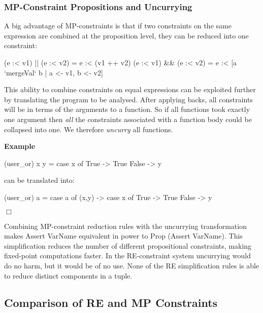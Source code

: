 \documentclass[preprint]{sigplanconf}
\newcommand{\C}[1]{\textsf{#1}}
\newcounter{exmp}
\newcommand{\yesexample}{\addtocounter{exmp}{1}\addvspace{2mm}\noindent\textbf{Example \arabic{exmp}}}
\newcommand{\noexample}{\hfill$\Box$\par\addvspace{2mm}}
\newenvironment{example}{\yesexample}{\noexample}
\begin{document}
\subsubsection{MP-Constraint Propositions and Uncurrying}

A big advantage of MP-constraints is that if two constraints on the same expression are combined at the proposition level, they can be reduced into one constraint:

\begin{code}
(e :< v1) || (e :< v2) = e :< (v1 ++ v2)
(e :< v1) && (e :< v2) = e :< [a `mergeVal` b | a <- v1, b <- v2]
\end{code}

\noindent This ability to combine constraints on equal expressions can be exploited further by translating the program to be analysed. After applying \C{backs}, all constraints will be in terms of the arguments to a function. So if all functions took exactly one argument then \textit{all} the constraints associated with a function body could be collapsed into one. We therefore \textit{uncurry} all functions.

\begin{example}
\begin{code}
(user_or) x y = case  x of
                      True   -> True
                      False  -> y
\end{code}

\noindent can be translated into:

\begin{code}
(user_or) a = case  a of
                    (x,y) -> case  x of
                                   True    -> True
                                   False   -> y
\end{code}
\end{example}

Combining MP-constraint reduction rules with the uncurrying transformation makes \C{Assert VarName} equivalent in power to \C{Prop (Assert VarName)}. This simplification reduces the number of different propositional constraints, making fixed-point computations faster. In the RE-constraint system uncurrying would do no harm, but it would be of no use. None of the RE simplification rules is able to reduce distinct components in a tuple.

\subsection{Comparison of RE and MP Constraints}
\end{document}
